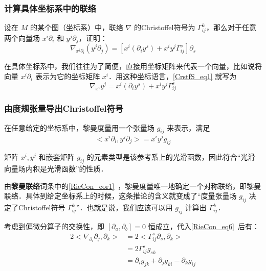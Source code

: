 \subsubsection{计算具体坐标系中的联络}

\begin{exercise}{}
设在 $M$ 的某个图（坐标系）中，联络 $\nabla$ 的Christoffel符号为 $\Gamma^k_{ij}$，那么对于任意两个向量场 $x^i\partial_i$ 和 $y^j\partial_j$，证明：
\begin{equation}\label{CrstfS_eq1}
\nabla_{x^i\partial_i}(y^j\partial_j)=[x^i(\partial_iy^s)+x^iy^j\Gamma^s_{ij}]\partial_s
\end{equation}
\end{exercise}

在具体坐标系中，我们往往为了简便，直接用坐标矩阵来代表一个向量，比如说将向量 $x^i\partial_i$ 表示为它的坐标矩阵 $x^i$．用这种坐标语言，\autoref{CrstfS_eq1} 就写为
\begin{equation}\label{CrstfS_eq4}
\nabla_{x^i}y^j=x^i(\partial_iy^s)+x^iy^j\Gamma^s_{ij}
\end{equation}

\subsubsection{由度规张量导出Christoffel符号}

在任意给定的坐标系中，黎曼度量用一个张量场 $g_{ij}$ 来表示，满足
\begin{equation}
<x^i\partial_i, y^j\partial_j>=x^iy^jg_{ij}
\end{equation}

矩阵 $x^i, y^j$ 和嵌套矩阵 $g_{ij}$ 的元素类型是该参考系上的光滑函数，因此符合“光滑向量场内积是光滑函数”的性质．

由\textbf{黎曼联络}词条中的\autoref{RieCon_cor1}~，黎曼度量唯一地确定一个对称联络，即黎曼联络．具体到给定坐标系上的时候，这条推论的含义就变成了“度量张量场 $g_{ij}$ 决定了Christoffel符号 $\Gamma^k_{ij}$”．也就是说，我们应该可以用 $g_{ij}$ 计算出 $\Gamma^k_{ij}$．

考虑到偏微分算子的交换性，即 $[\partial_a, \partial_b]=0$ 恒成立，代入\autoref{RieCon_eq6}~后有：
\begin{equation}\label{CrstfS_eq2}
\begin{aligned}
2<\nabla_{\partial_i}\partial_j, \partial_k>&=2<\Gamma^s_{ij}\partial_s, \partial_k>\\
&=2\Gamma^s_{ij}g_{sk}\\
&=\partial_ig_{jk}+\partial_jg_{ki}-\partial_kg_{ij}
\end{aligned}
\end{equation}

